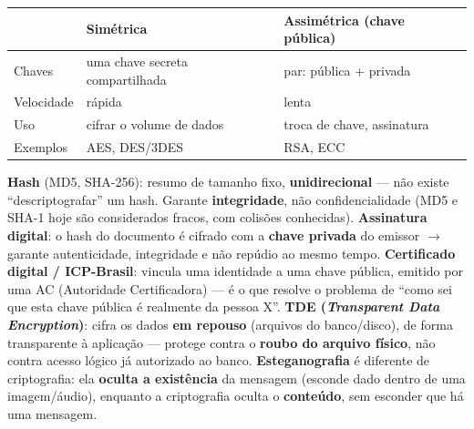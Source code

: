 \begin{conceito}
\begin{center}
\begin{tabular}{@{}p{2.6cm}p{4.6cm}p{4.6cm}@{}}
\toprule
& \textbf{Simétrica} & \textbf{Assimétrica (chave pública)} \\
\midrule
Chaves & uma chave secreta compartilhada & par: pública + privada \\
Velocidade & rápida & lenta \\
Uso & cifrar o volume de dados & troca de chave, assinatura \\
Exemplos & AES, DES/3DES & RSA, ECC \\
\bottomrule
\end{tabular}
\end{center}
\end{conceito}

\begin{conceito}
\textbf{Hash} (MD5, SHA-256): resumo de tamanho fixo, \textbf{unidirecional}
--- não existe “descriptografar” um hash. Garante \textbf{integridade}, não
confidencialidade (MD5 e SHA-1 hoje são considerados fracos, com colisões
conhecidas). \textbf{Assinatura digital}: o hash do documento é cifrado
com a \textbf{chave privada} do emissor $\to$ garante autenticidade,
integridade e não repúdio ao mesmo tempo. \textbf{Certificado digital /
ICP-Brasil}: vincula uma identidade a uma chave pública, emitido por uma
AC (Autoridade Certificadora) --- é o que resolve o problema de “como sei
que esta chave pública é realmente da pessoa X”. \textbf{TDE
(\textit{Transparent Data Encryption})}: cifra os dados \textbf{em
repouso} (arquivos do banco/disco), de forma transparente à aplicação ---
protege contra o \textbf{roubo do arquivo físico}, não contra acesso
lógico já autorizado ao banco. \textbf{Esteganografia} é diferente de
criptografia: ela \textbf{oculta a existência} da mensagem (esconde dado
dentro de uma imagem/áudio), enquanto a criptografia oculta o
\textbf{conteúdo}, sem esconder que há uma mensagem.
\end{conceito}

